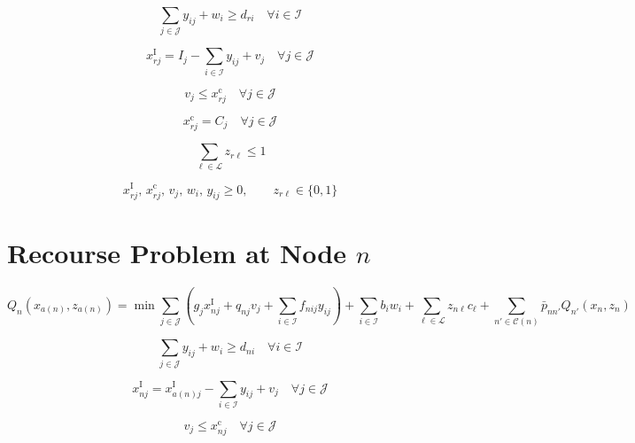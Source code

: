 \documentclass{article}
\begin{document}
\begin{equation}
\sum_{j \in \mathcal J} y_{ij} + w_i \ge d_{ri}
\quad \forall i \in \mathcal I
\tag{9a}
\end{equation}

\begin{equation}
x_{rj}^{\mathrm I} = I_j - \sum_{i \in \mathcal I} y_{ij} + v_j
\quad \forall j \in \mathcal J
\tag{9b}
\end{equation}

\begin{equation}
v_j \le x_{rj}^{\mathrm c}
\quad \forall j \in \mathcal J
\tag{9c}
\end{equation}

\begin{equation}
x_{rj}^{\mathrm c} = C_j
\quad \forall j \in \mathcal J
\tag{9d}
\end{equation}

\begin{equation}
\sum_{\ell \in \mathcal L} z_{r\ell} \le 1
\tag{9e}
\end{equation}

\begin{equation}
x_{rj}^{\mathrm I},\, x_{rj}^{\mathrm c},\, v_j,\, w_i,\, y_{ij} \ge 0,\qquad
z_{r\ell} \in \{0,1\}
\tag{9f}
\end{equation}

\section*{Recourse Problem at Node $n$}
\begin{equation}
Q_n(x_{a(n)}, z_{a(n)}) =
\min
\sum_{j \in \mathcal J}
\left(
g_j x_{nj}^{\mathrm I} + q_{nj} v_j + \sum_{i \in \mathcal I} f_{nij} y_{ij}
\right)
+
\sum_{i \in \mathcal I} b_i w_i
+
\sum_{\ell \in \mathcal L} z_{n\ell} c_\ell
+
\sum_{n' \in \mathcal C(n)} \bar p_{nn'} Q_{n'}(x_n, z_n)
\tag{10-Obj}
\end{equation}

\begin{equation}
\sum_{j \in \mathcal J} y_{ij} + w_i \ge d_{ni}
\quad \forall i \in \mathcal I
\tag{10a}
\end{equation}

\begin{equation}
x_{nj}^{\mathrm I} = x_{a(n)j}^{\mathrm I} - \sum_{i \in \mathcal I} y_{ij} + v_j
\quad \forall j \in \mathcal J
\tag{10b}
\end{equation}

\begin{equation}
v_j \le x_{nj}^{\mathrm c}
\quad \forall j \in \mathcal J
\tag{10c}
\end{equation}
\end{document}
